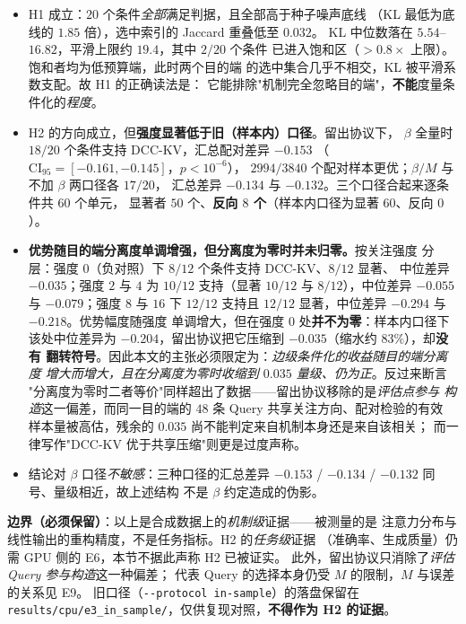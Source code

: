 \begin{itemize}
  \item H1 成立：$20$ 个条件\emph{全部}满足判据，且全部高于种子噪声底线
        （KL 最低为底线的 $1.85$ 倍），选中索引的 Jaccard 重叠低至 $0.032$。
        KL 中位数落在 $5.54$--$16.82$，平滑上限约 $19.4$，其中 $2/20$ 个条件
        已进入饱和区（$>0.8\times$ 上限）。饱和者均为低预算端，此时两个目的端
        的选中集合几乎不相交，KL 被平滑系数支配。故 H1 的正确读法是：
        它能排除"机制完全忽略目的端"，\textbf{不能}度量条件化的\emph{程度}。
  \item H2 的方向成立，但\textbf{强度显著低于旧（样本内）口径}。留出协议下，
        $\beta$ 全量时 $18/20$ 个条件支持 DCC-KV，汇总配对差异 $-0.153$
        （$\mathrm{CI}_{95}=[-0.161,-0.145]$，$p<10^{-6}$），
        $2994/3840$ 个配对样本更优；$\beta/M$ 与不加 $\beta$ 两口径各 $17/20$，
        汇总差异 $-0.134$ 与 $-0.132$。三个口径合起来逐条件共 $60$ 个单元，
        显著者 $50$ 个、\textbf{反向 $8$ 个}（样本内口径为显著 $60$、反向 $0$）。
        \item \textbf{优势随目的端分离度单调增强，但分离度为零时并未归零。}按关注强度
        分层：强度 $0$（负对照）下 $8/12$ 个条件支持 DCC-KV、$8/12$ 显著、
        中位差异 $-0.035$；强度 $2$ 与 $4$ 为 $10/12$ 支持（显著 $10/12$ 与
        $8/12$），中位差异 $-0.055$ 与 $-0.079$；强度 $8$ 与 $16$ 下 $12/12$
        支持且 $12/12$ 显著，中位差异 $-0.294$ 与 $-0.218$。优势幅度随强度
        单调增大，但在强度 $0$ 处\textbf{并不为零}：样本内口径下该处中位差异为
        $-0.204$，留出协议把它压缩到 $-0.035$（缩水约 $83\%$），却\textbf{没有
        翻转符号}。因此本文的主张必须限定为：\emph{边级条件化的收益随目的端分离度
        增大而增大，且在分离度为零时收缩到 $0.035$ 量级、仍为正}。反过来断言
        "分离度为零时二者等价"同样超出了数据——留出协议移除的是\emph{评估点参与
        构造}这一偏差，而同一目的端的 $48$ 条 Query 共享关注方向、配对检验的有效
        样本量被高估，残余的 $0.035$ 尚不能判定来自机制本身还是来自该相关；
        而一律写作"DCC-KV 优于共享压缩"则更是过度声称。
  \item 结论对 $\beta$ 口径\emph{不敏感}：三种口径的汇总差异
        $-0.153$ / $-0.134$ / $-0.132$ 同号、量级相近，故上述结构
        不是 $\beta$ 约定造成的伪影。
\end{itemize}

\textbf{边界（必须保留）}：以上是合成数据上的\emph{机制级}证据——被测量的是
注意力分布与线性输出的重构精度，不是任务指标。H2 的\emph{任务级}证据
（准确率、生成质量）仍需 GPU 侧的 E6，本节不据此声称 H2 已被证实。
此外，留出协议只消除了\emph{评估 Query 参与构造}这一种偏差；
代表 Query 的选择本身仍受 $M$ 的限制，$M$ 与误差的关系见 E9。
旧口径（\texttt{-{}-protocol in-sample}）的落盘保留在
\texttt{results/cpu/e3\_in\_sample/}，仅供复现对照，\textbf{不得作为 H2 的证据}。

